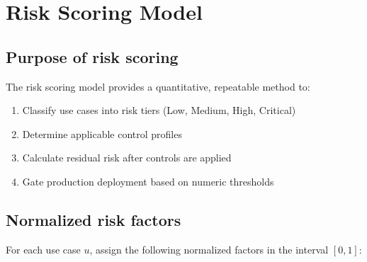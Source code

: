 \chapter{Risk Scoring Model}
\label{ch:risk}

\section{Purpose of risk scoring}

The risk scoring model provides a quantitative, repeatable method to:

\begin{enumerate}
  \item Classify use cases into risk tiers (Low, Medium, High, Critical)
  \item Determine applicable control profiles
  \item Calculate residual risk after controls are applied
  \item Gate production deployment based on numeric thresholds
\end{enumerate}

\section{Normalized risk factors}

For each use case $u$, assign the following normalized factors in the
interval $[0,1]$:

